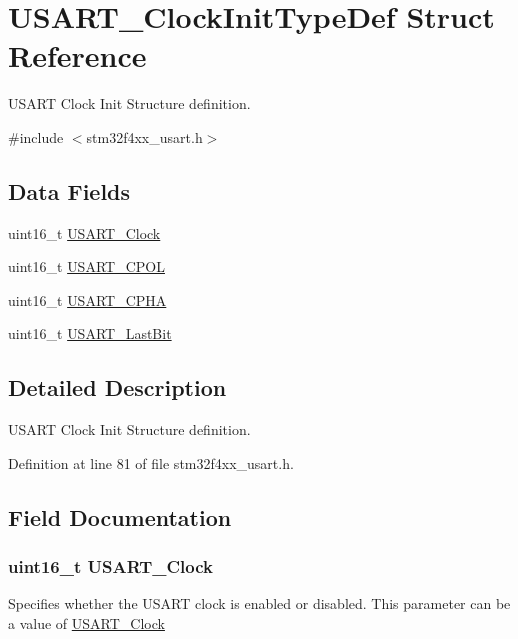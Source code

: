 \hypertarget{struct_u_s_a_r_t___clock_init_type_def}{\section{U\-S\-A\-R\-T\-\_\-\-Clock\-Init\-Type\-Def Struct Reference}
\label{struct_u_s_a_r_t___clock_init_type_def}
}


U\-S\-A\-R\-T Clock Init Structure definition.  




{\ttfamily \#include $<$stm32f4xx\-\_\-usart.\-h$>$}

\subsection*{Data Fields}
\begin{DoxyCompactItemize}
\item 
uint16\-\_\-t \hyperlink{struct_u_s_a_r_t___clock_init_type_def_a17b0a201922d9d4bad57583b9766904a}{U\-S\-A\-R\-T\-\_\-\-Clock}
\item 
uint16\-\_\-t \hyperlink{struct_u_s_a_r_t___clock_init_type_def_ab6507c7489a2e05e4ef1ade9fbf057d5}{U\-S\-A\-R\-T\-\_\-\-C\-P\-O\-L}
\item 
uint16\-\_\-t \hyperlink{struct_u_s_a_r_t___clock_init_type_def_ae8d00e2e6f99439097a1b56cd33dd9f4}{U\-S\-A\-R\-T\-\_\-\-C\-P\-H\-A}
\item 
uint16\-\_\-t \hyperlink{struct_u_s_a_r_t___clock_init_type_def_a998735e29b6f77d3e993d8d34c74cbca}{U\-S\-A\-R\-T\-\_\-\-Last\-Bit}
\end{DoxyCompactItemize}


\subsection{Detailed Description}
U\-S\-A\-R\-T Clock Init Structure definition. 

Definition at line 81 of file stm32f4xx\-\_\-usart.\-h.



\subsection{Field Documentation}
\hypertarget{struct_u_s_a_r_t___clock_init_type_def_a17b0a201922d9d4bad57583b9766904a}{
\subsubsection[{U\-S\-A\-R\-T\-\_\-\-Clock}]{\setlength{\rightskip}{0pt plus 5cm}uint16\-\_\-t U\-S\-A\-R\-T\-\_\-\-Clock}}\label{struct_u_s_a_r_t___clock_init_type_def_a17b0a201922d9d4bad57583b9766904a}
Specifies whether the U\-S\-A\-R\-T clock is enabled or disabled. This parameter can be a value of \hyperlink{group___u_s_a_r_t___clock}{U\-S\-A\-R\-T\-\_\-\-Clock} 

